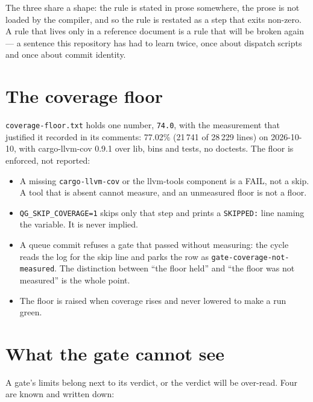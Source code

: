 The three share a shape: the rule is stated in prose somewhere, the prose is not loaded by the
compiler, and so the rule is restated as a step that exits non-zero. A rule that lives only in
a reference document is a rule that will be broken again --- a sentence this repository has
had to learn twice, once about dispatch scripts and once about commit identity.

\section{The coverage floor}

\texttt{coverage-floor.txt} holds one number, \texttt{74.0}, with the measurement that
justified it recorded in its comments: 77.02\% (21\,741 of 28\,229 lines) on 2026-10-10, with
cargo-llvm-cov 0.9.1 over lib, bins and tests, no doctests. The floor is enforced, not
reported:

\begin{itemize}
	\item A missing \texttt{cargo-llvm-cov} or the llvm-tools component is a FAIL, not a skip.
	A tool that is absent cannot measure, and an unmeasured floor is not a floor.
	\item \texttt{QG\_SKIP\_COVERAGE=1} skips only that step and prints a \texttt{SKIPPED:}
	line naming the variable. It is never implied.
	\item A queue commit refuses a gate that passed without measuring: the cycle reads the log
	for the skip line and parks the row as \texttt{gate-coverage-not-measured}. The distinction
	between ``the floor held'' and ``the floor was not measured'' is the whole point.
	\item The floor is raised when coverage rises and never lowered to make a run green.
\end{itemize}

\section{What the gate cannot see}

A gate's limits belong next to its verdict, or the verdict will be over-read. Four are known
and written down:


